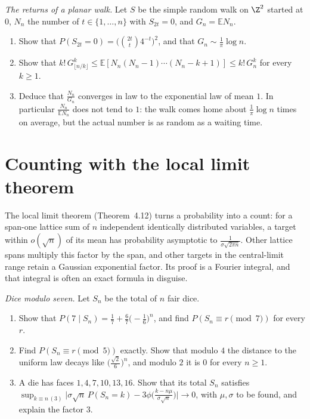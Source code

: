 \begin{exercise}[$\star\star\star$]\label{pb:erdostaylor}
\emph{The returns of a planar walk.} Let $S$ be the simple random walk on $\Z^2$ started at $0$, $N_n$ the number of $t\in\{1,\dots,n\}$ with $S_{2t}=0$, and
$G_n=\mathbb EN_n$.
\begin{enumerate}[label=(\alph*)]
\item Show that $P(S_{2t}=0)=\bigl(\binom{2t}t4^{-t}\bigr)^2$, and that $G_n\sim\frac1\pi\log n$.
\item Show that $k!\,G_{\lfloor n/k\rfloor}^k\le\mathbb E[N_n(N_n-1)\cdots(N_n-k+1)]\le k!\,G_n^k$ for every $k\ge1$.
\item Deduce that $\frac{N_n}{G_n}$ converges in law to the exponential law of mean $1$. In particular $\frac{N_n}{\mathbb EN_n}$ does not tend to $1$: the walk comes home
about $\frac1\pi\log n$ times on average, but the actual number is as random as a waiting time.
\end{enumerate}
\end{exercise}

\section{Counting with the local limit theorem}

The local limit theorem (Theorem~4.12) turns a probability into a count: for a span-one lattice sum of $n$ independent identically distributed variables, a target within $o(\sqrt n)$ of its mean has probability asymptotic to $\frac{1}{\sigma\sqrt{2\pi n}}$. Other lattice spans multiply this factor by the span, and other targets in the central-limit range retain a Gaussian exponential factor. Its proof is a Fourier integral, and that integral is often an exact formula in disguise.

\begin{exercise}[$\star$]\label{pb:dice}
\emph{Dice modulo seven.} Let $S_n$ be the total of $n$ fair dice.
\begin{enumerate}[label=(\alph*)]
\item Show that $P(7\mid S_n)=\frac17+\frac67\bigl(-\frac16\bigr)^n$, and find $P(S_n\equiv r\pmod7)$ for every $r$.
\item Find $P(S_n\equiv r\pmod5)$ exactly. Show that modulo $4$ the distance to the uniform law decays like $\bigl(\frac{\sqrt2}6\bigr)^n$, and modulo $2$ it is $0$ for
every $n\ge1$.
\item A die has faces $1,4,7,10,13,16$. Show that its total $S_n$ satisfies $\sup_{k\equiv n\,(3)}\bigl|\sigma\sqrt n\,P(S_n=k)-3\phi\bigl(\frac{k-n\mu}{\sigma\sqrt n}\bigr)\bigr|\to0$,
with $\mu,\sigma$ to be found, and explain the factor $3$.
\end{enumerate}
\end{exercise}

